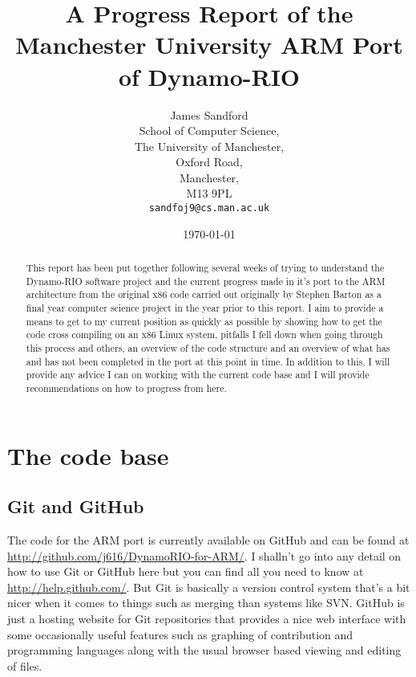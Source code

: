 \documentclass[a4paper]{article}
\title{A Progress Report of the Manchester University ARM Port of 
Dynamo-RIO}
\author{James Sandford\\
School of Computer Science,\\
The University of Manchester,\\
Oxford Road,\\
Manchester,\\
M13 9PL\\
\texttt{sandfoj9@cs.man.ac.uk}}
\date{\today}
\begin{document}
\maketitle
\newpage


\begin{abstract}
This report has been put together following several weeks of trying to
understand the Dynamo-RIO software project and the current progress made 
in it's
port to the ARM architecture from the original x86 code carried out 
originally 
by Stephen Barton as a final year computer science project in the year 
prior to 
this report. I aim to provide a means to get to my current position as 
quickly
as possible by showing how to get the code cross compiling on an x86 
Linux
system, pitfalls I fell down when going through this process and others, 
an
overview of the code structure and an overview of what has and has not 
been
completed in the port at this point in time. In addition to this, I will 
provide
any advice I can on working with the current code base and I will 
provide
recommendations on how to progress from here.
\end{abstract}
\newpage


\tableofcontents
\newpage


\section{The code base}
\subsection{Git and GitHub}
The code for the ARM port is currently available on GitHub and can be 
found at
\url{http://github.com/j616/DynamoRIO-for-ARM/}. I shalln't go into any 
detail
on how to use Git or GitHub here but you can find all you need to know 
at
\url{http://help.github.com/}. But Git is basically a version control 
system
that's a bit nicer when it comes to things such as merging than systems 
like
SVN. GitHub is just a hosting website for Git repositories that provides 
a nice
web interface with some occasionally useful features such as graphing 
of
contribution and programming languages along with the usual browser 
based
viewing and editing of files.
\end{document}
